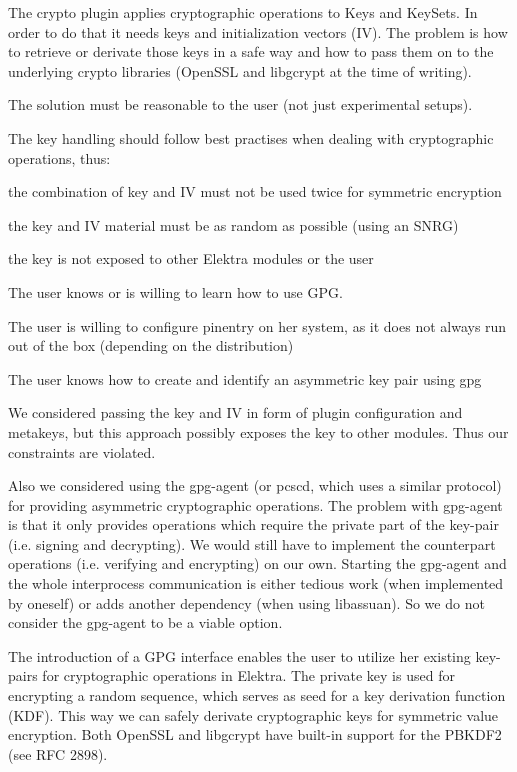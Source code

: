The crypto plugin applies cryptographic operations to Keys and Key\+Sets. In order to do that it needs keys and initialization vectors (IV). The problem is how to retrieve or derivate those keys in a safe way and how to pass them on to the underlying crypto libraries (Open\+S\+SL and libgcrypt at the time of writing).

The solution must be reasonable to the user (not just experimental setups).

The key handling should follow best practises when dealing with cryptographic operations, thus\+:


\begin{DoxyItemize}
\item the combination of key and IV must not be used twice for symmetric encryption
\item the key and IV material must be as random as possible (using an S\+N\+RG)
\item the key is not exposed to other Elektra modules or the user
\end{DoxyItemize}


\begin{DoxyItemize}
\item The user knows or is willing to learn how to use G\+PG.
\item The user is willing to configure {\ttfamily pinentry} on her system, as it does not always run out of the box (depending on the distribution)
\item The user knows how to create and identify an asymmetric key pair using {\ttfamily gpg}
\end{DoxyItemize}

We considered passing the key and IV in form of plugin configuration and metakeys, but this approach possibly exposes the key to other modules. Thus our constraints are violated.

Also we considered using the gpg-\/agent (or pcscd, which uses a similar protocol) for providing asymmetric cryptographic operations. The problem with gpg-\/agent is that it only provides operations which require the private part of the key-\/pair (i.\+e. signing and decrypting). We would still have to implement the counterpart operations (i.\+e. verifying and encrypting) on our own. Starting the gpg-\/agent and the whole interprocess communication is either tedious work (when implemented by oneself) or adds another dependency (when using libassuan). So we do not consider the gpg-\/agent to be a viable option.

The introduction of a G\+PG interface enables the user to utilize her existing key-\/pairs for cryptographic operations in Elektra. The private key is used for encrypting a random sequence, which serves as seed for a key derivation function (K\+DF). This way we can safely derivate cryptographic keys for symmetric value encryption. Both Open\+S\+SL and libgcrypt have built-\/in support for the P\+B\+K\+D\+F2 (see R\+FC 2898).

